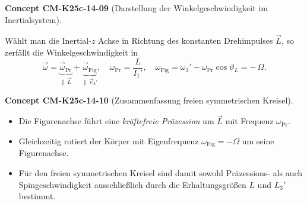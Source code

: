 \documentclass[10pt, letterpaper]{article}
\newcommand{\CustomHeading}[3]{%
  \par\medskip\noindent%
  \textbf{#1 #2} \textnormal{(#3)}.\enskip%
}
\newenvironment{CONC}[2]{\CustomHeading{Concept}{#1}{#2}}{}
\begin{document}
\begin{CONC}{CM-K25c-14-09}{Darstellung der Winkelgeschwindigkeit im Inertialsystem}
Wählt man die Inertial-$z$ Achse in Richtung des konstanten
Drehimpulses $\vec L$, so zerfällt die Winkelgeschwindigkeit in
\[
\vec\omega = \underbrace{\vec\omega_{\!\text{Pr}}}_{\parallel\,\vec L}
             +\underbrace{\vec\omega_{\!\text{Fig}}}_{\parallel\,\vec e_3'},
\quad
\omega_{\!\text{Pr}}=\frac{L}{I_1'},
\quad
\omega_{\!\text{Fig}}=\omega_3' - \omega_{\!\text{Pr}}\cos\vartheta_L
                    = -\,\Omega .
\]
\end{CONC}

\begin{CONC}{CM-K25c-14-10}{Zusammenfassung freien symmetrischen Kreisel}
\begin{itemize}
\item Die Figurenachse führt eine \emph{kräftefreie Präzession} um
      $\vec L$ mit Frequenz $\omega_{\!\text{Pr}}$.
\item Gleichzeitig rotiert der Körper mit
      Eigenfrequenz $\omega_{\!\text{Fig}}=-\Omega$ um seine
      Figurenachse.
\item Für den freien symmetrischen Kreisel sind damit sowohl
      Präzessions- als auch Spingeschwindigkeit ausschließlich durch die
      Erhaltungsgrößen $L$ und $L_3'$ bestimmt.
\end{itemize}
\end{CONC}
\end{document}
